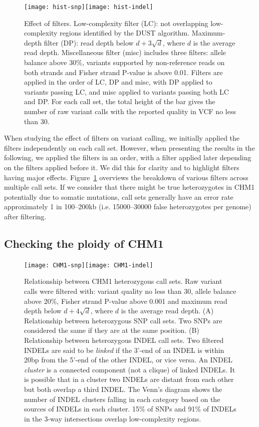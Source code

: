 \documentclass{bioinfo}
\begin{document}
\begin{figure}[!ht]
\texttt{[image: hist-snp]}\texttt{[image: hist-indel]}
\caption{Effect of filters. Low-complexity filter (LC): not overlapping
low-complexity regions identified by the DUST algorithm. Maximum-depth filter
(DP): read depth below $d+3\sqrt{d}$, where $d$ is the average read depth.
Miscellaneous filter (misc) includes three filters: allele balance above 30\%,
variants supported by non-reference reads on both strands and Fisher strand
P-value is above 0.01. Filters are applied in the order of LC, DP and misc,
with DP applied to variants passing LC, and misc applied to variants passing
both LC and DP. For each call set, the total height of the bar gives the
number of raw variant calls with the reported quality in VCF no less than 30.}\label{fig:hist}
\end{figure}

When studying the effect of filters on variant calling, we initially applied
the filters independently on each call set. However, when presenting the
results in the following, we applied the filters in an order, with a filter
applied later depending on the filters applied before it. We did this for
clarity and to highlight filters having major effects. Figure~\ref{fig:hist}
overviews the breakdown of various filters across multiple call sets.
If we consider that there might be true heterozygotes in CHM1 potentially due
to somatic mutations, call sets generally have an error rate approximately 1 in
100--200kb (i.e. 15000--30000 false heterozygotes per genome) after filtering.

\subsection{Checking the ploidy of CHM1}

\begin{figure}
\texttt{[image: CHM1-snp]}\texttt{[image: CHM1-indel]}
\caption{Relationship between CHM1 heterozygous call sets. Raw variant calls were filtered
with: variant quality no less than 30, allele balance above 20\%, Fisher strand
P-value above 0.001 and maximum read depth below $d+4\sqrt{d}$, where $d$ is
the average read depth. (A) Relationship between heterozygous SNP call sets. Two SNPs are
considered the same if they are at the same position. (B) Relationship between heterozygous
INDEL call sets. Two filtered INDELs are said to be \emph{linked} if the 3'-end
of an INDEL is within 20bp from the 5'-end of the other INDEL, or vice versa.
An INDEL \emph{cluster} is a connected component (not a clique) of linked
INDELs. It is possible that in a cluster two INDELs are distant from each other
but both overlap a third INDEL.  The Venn's diagram shows the number of INDEL
clusters falling in each category based on the sources of INDELs in each
cluster. 15\% of SNPs and 91\% of INDELs in the 3-way intersections overlap
low-complexity regions.}\label{fig:venn-CHM1}
\end{figure}
\end{document}
